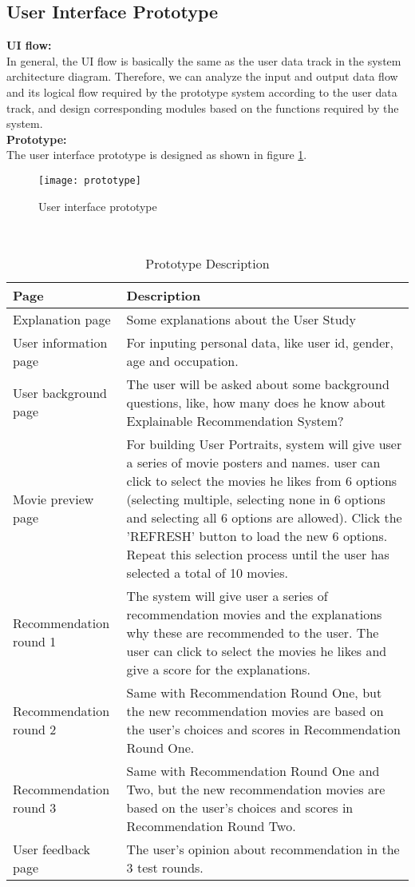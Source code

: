 \subsection{User Interface Prototype} 

\textbf{UI flow:}\\
In general, the UI flow is basically the same as the user data track in the system architecture diagram. Therefore, we can analyze the input and output data flow and its logical flow required by the prototype system according to the user data track, and design corresponding modules based on the functions required by the system.\\
\textbf{Prototype:}\\
The user interface prototype is designed as shown in figure \ref{figure:12}.

\begin{figure}[h]
\caption{User interface prototype}
\label{figure:12}
\centering
\texttt{[image: prototype]}
\end{figure}
\leavevmode\\


\begin{table}[h!]
\renewcommand\arraystretch{1.5}
\centering
\begin{tabular}{p{100pt}p{300pt}}\toprule
 \hline
 Page & Description \\ [0.5ex] 
 \hline
  Explanation page & Some explanations about the User Study \\
User information page &  For inputing personal data, like user id, gender, age and occupation.\\
User background page  &  The user will be asked about some background questions, like, how many does he know about Explainable Recommendation System?\\
Movie preview page  &  For building User Portraits, system will give user a series of movie posters and names. user can click to select the movies he likes from 6 options (selecting multiple, selecting none in 6 options and selecting all 6 options are allowed). Click the 'REFRESH' button to load the new 6 options. Repeat this selection process until the user has selected a total of 10 movies. \\
Recommendation round 1  &  The system will give user a series of recommendation movies and the explanations why these are recommended to the user. The user can click to select the movies he likes and give a score for the explanations. \\
Recommendation round 2  &  Same with Recommendation Round One, but the new recommendation movies are based on the user's choices and scores in Recommendation Round One. \\
Recommendation round 3  &  Same with Recommendation Round One and Two, but the new recommendation movies are based on the user's choices and scores in Recommendation Round Two. \\
User feedback page   &  The user's opinion about recommendation in the 3 test rounds.\\
  [1ex] 
 \hline
\end{tabular}
\caption{Prototype Description}
\label{table:1}
\end{table}


\cleardoublepage